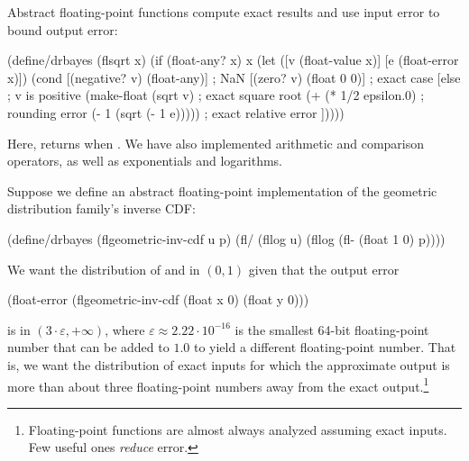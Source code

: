 Abstract floating-point functions compute exact results and use input error to bound output error:
\begin{center}\singlespacing
\begin{schemedisplay}
(define/drbayes (flsqrt x)
  (if (float-any? x)
      x
      (let ([v  (float-value x)]
            [e  (float-error x)])
        (cond [(negative? v)  (float-any)]  ; NaN
              [(zero? v)      (float 0 0)]  ; exact case
              [else
               ; v is positive
               (make-float (sqrt v)                   ; exact square root
                           (+ (* 1/2 epsilon.0)       ; rounding error
                              (- 1 (sqrt (- 1 e)))))  ; exact relative error
              ]))))
\end{schemedisplay}
\end{center}
Here,  returns  when .
We have also implemented arithmetic and comparison operators, as well as exponentials and logarithms.

Suppose we define an abstract floating-point implementation of the geometric distribution family's inverse CDF:
\begin{center}\singlespacing
\begin{schemedisplay}
(define/drbayes (flgeometric-inv-cdf u p)
  (fl/ (fllog u) (fllog (fl- (float 1 0) p))))
\end{schemedisplay}
\end{center}
We want the distribution of  and  in $(0,1)$ given that the output error
\begin{center}
\begin{schemedisplay}
(float-error (flgeometric-inv-cdf (float x 0) (float y 0)))
\end{schemedisplay}
\end{center}
is in $(3 \cdot \varepsilon,+\infty)$, where $\varepsilon \approx 2.22\cdot 10^{-16}$ is the smallest 64-bit floating-point number that can be added to $1.0$ to yield a different floating-point number.
That is, we want the distribution of exact inputs for which the approximate output is more than about three floating-point numbers away from the exact output.\footnote{Floating-point functions are almost always analyzed assuming exact inputs. Few useful ones \emph{reduce} error.}

